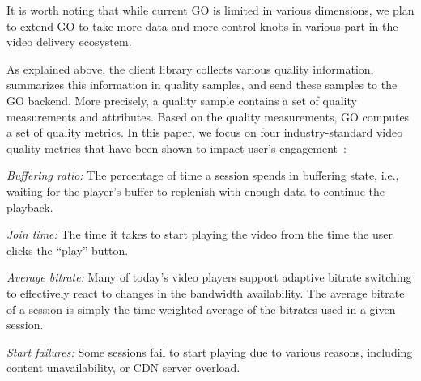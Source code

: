 
It is worth noting that while current GO is limited in various dimensions,
we plan to extend GO to take more data and more control knobs in various 
part in the video delivery ecosystem.

\label{subsec:dataset}

As explained above, the client library collects various quality
information, summarizes this information in quality samples, and send
these samples to the GO backend. More precisely, a quality sample
contains a set of quality measurements and attributes. Based on the
quality measurements, GO computes a set of quality metrics. In this
paper, we focus on four industry-standard video quality metrics that
have been shown to impact user's engagement~\cite{sigcomm11}:

\begin{packedenumerate}
\item \emph{Buffering ratio:} The percentage of time a session spends
  in buffering state, i.e., waiting for the player's buffer to
  replenish with enough data to continue the playback.
\item \emph{Join time:} The time it takes to start playing the video
  from the time the user clicks the ``play'' button.
\item \emph{Average bitrate:} Many of today's video players support
  adaptive bitrate switching to effectively react to changes in the
  bandwidth availability. The average bitrate of a session is simply
  the time-weighted average of the bitrates used in a given session.
\item \emph{Start failures:} Some sessions fail to start playing due
  to various reasons, including content unavailability, or CDN server
  overload.
\end{packedenumerate}

